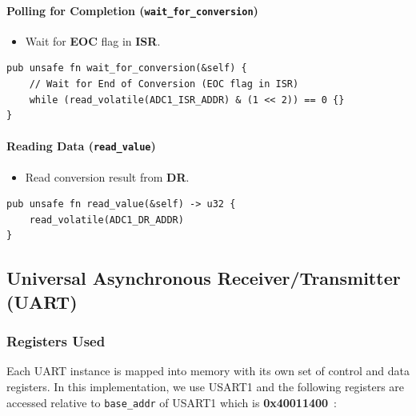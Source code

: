 \documentclass[12pt,a4paper]{article}
\begin{document}
\paragraph{Polling for Completion (\texttt{wait\_for\_conversion})}
\begin{itemize}
    \item Wait for \textbf{EOC} flag in \textbf{ISR}.
\end{itemize}

\begin{lstlisting}[caption={Polling for ADC Completion}, label={lst: adc-complete}]
pub unsafe fn wait_for_conversion(&self) {
    // Wait for End of Conversion (EOC flag in ISR)
    while (read_volatile(ADC1_ISR_ADDR) & (1 << 2)) == 0 {}
}
\end{lstlisting}

\paragraph{Reading Data (\texttt{read\_value})}
\begin{itemize}
    \item Read conversion result from \textbf{DR}.
\end{itemize}

\begin{lstlisting}[caption={Reading Converted Value}, label={lst: adc-read}]
pub unsafe fn read_value(&self) -> u32 {
    read_volatile(ADC1_DR_ADDR)
}
\end{lstlisting}

\subsection{Universal Asynchronous Receiver/Transmitter (UART)}

\subsubsection{Registers Used}

Each UART instance is mapped into memory with its own set of control and data registers. In this implementation, we use USART1 and the following registers are accessed relative to \texttt{base\_addr} of USART1 which is \textbf{0x40011400}~\cite[pp.~134]{ref-manual}:
\end{document}
